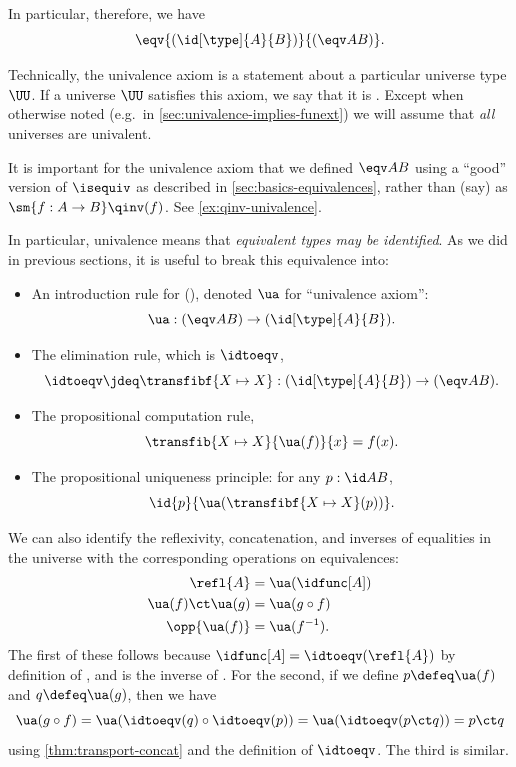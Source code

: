 In particular, therefore, we have
  \[
\eqv{(\id[\type]{A}{B})}{(\eqv A B)}.
\]

Technically, the univalence axiom is a statement about a particular universe type $\UU$.
If a universe $\UU$ satisfies this axiom, we say that it is .
%
%
Except when otherwise noted (e.g.\ in \cref{sec:univalence-implies-funext}) we will assume that \emph{all} universes are univalent.

\begin{rmk}
  It is important for the univalence axiom that we defined $\eqv AB$ using a ``good'' version of $\isequiv$ as described in \cref{sec:basics-equivalences}, rather than (say) as $\sm{f:A\to B} \qinv(f)$.
  See \cref{ex:qinv-univalence}.
\end{rmk}

In particular, univalence means that \emph{equivalent types may be identified}.
As we did in previous sections, it is useful to break this equivalence into:
%
\begin{itemize}
\item An introduction rule for {()}, denoted $\ua$ for ``univalence axiom'':
  \[
  \ua : ({\eqv A B}) \to (\id[\type]{A}{B}).
  \]
\item The elimination rule, which is $\idtoeqv$,
  \[
  \idtoeqv \jdeq \transfibf{X \mapsto X} : (\id[\type]{A}{B}) \to (\eqv A B).
  \]
\item The propositional computation rule,
  \[
  \transfib{X \mapsto X}{\ua(f)}{x} = f(x).
  \]
\item The propositional uniqueness principle: 
  for any $p : \id A B$,
  \[
  \id{p}{\ua(\transfibf{X \mapsto X}(p))}.
  \]
\end{itemize}
%
We can also identify the reflexivity, concatenation, and inverses of equalities in the universe with the corresponding operations on equivalences:
\begin{align*}
  \refl{A} &= \ua(\idfunc[A]) \\
  \ua(f) \ct \ua(g) &= \ua(g\circ f) \\
  \opp{\ua(f)} &= \ua(f^{-1}).
\end{align*}
The first of these follows because $\idfunc[A] = \idtoeqv(\refl{A})$ by definition of \idtoeqv, and \ua is the inverse of \idtoeqv.
For the second, if we define $p \defeq \ua(f)$ and $q\defeq \ua(g)$, then we have
\[ \ua(g\circ f) = \ua(\idtoeqv(q) \circ \idtoeqv(p)) = \ua(\idtoeqv(p\ct q)) = p\ct q\]
using \cref{thm:transport-concat} and the definition of $\idtoeqv$.
The third is similar.

